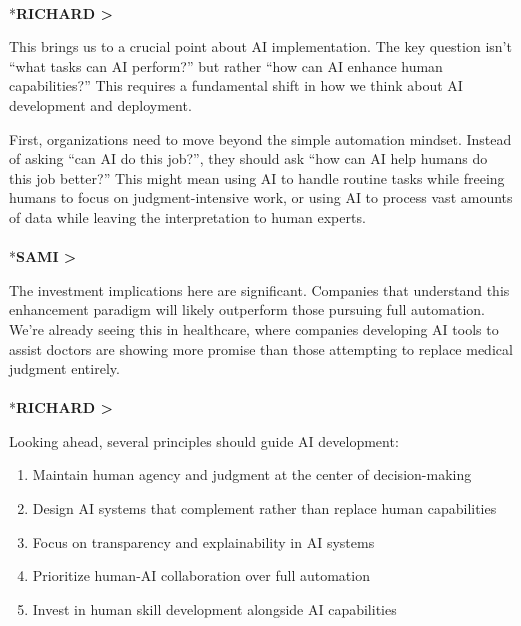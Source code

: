 \documentclass[
  Letterpaper,
]{scrbook}
\makeatletter
\let\oldparagraph\paragraph
\renewcommand{\paragraph}{
    \@ifstar
      \xxxParagraphStar
      \xxxParagraphNoStar
  }
\newcommand{\xxxParagraphStar}[1]{\oldparagraph*{#1}\mbox{}}
\newcommand{\xxxParagraphNoStar}[1]{\oldparagraph{#1}\mbox{}}
\providecommand{\tightlist}{%
  \setlength{\itemsep}{0pt}\setlength{\parskip}{0pt}}\usepackage{longtable,booktabs,array}
\makeatother
\begin{document}
\paragraph*{\texorpdfstring{\textbf{RICHARD
\textgreater{}}}{RICHARD \textgreater{}}}\label{richard-1}

This brings us to a crucial point about AI implementation. The key
question isn't ``what tasks can AI perform?'' but rather ``how can AI
enhance human capabilities?'' This requires a fundamental shift in how
we think about AI development and deployment.

First, organizations need to move beyond the simple automation mindset.
Instead of asking ``can AI do this job?'', they should ask ``how can AI
help humans do this job better?'' This might mean using AI to handle
routine tasks while freeing humans to focus on judgment-intensive work,
or using AI to process vast amounts of data while leaving the
interpretation to human experts.

\paragraph*{\texorpdfstring{\textbf{SAMI
\textgreater{}}}{SAMI \textgreater{}}}\label{sami-1}

The investment implications here are significant. Companies that
understand this enhancement paradigm will likely outperform those
pursuing full automation. We're already seeing this in healthcare, where
companies developing AI tools to assist doctors are showing more promise
than those attempting to replace medical judgment entirely.

\paragraph*{\texorpdfstring{\textbf{RICHARD
\textgreater{}}}{RICHARD \textgreater{}}}\label{richard-2}

Looking ahead, several principles should guide AI development:

\begin{enumerate}
\def\labelenumi{\arabic{enumi}.}
\tightlist
\item
  Maintain human agency and judgment at the center of decision-making
\item
  Design AI systems that complement rather than replace human
  capabilities
\item
  Focus on transparency and explainability in AI systems
\item
  Prioritize human-AI collaboration over full automation
\item
  Invest in human skill development alongside AI capabilities
\end{enumerate}
\end{document}
